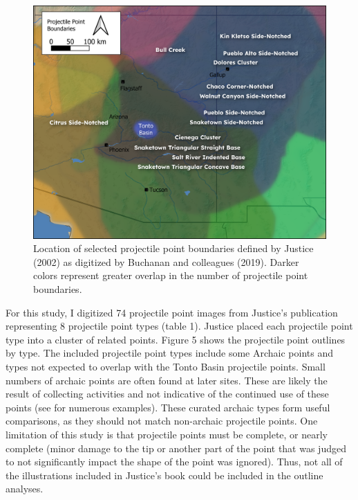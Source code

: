 \documentclass[a4paper]{article}
\begin{document}
\begin{figure}
\includegraphics[width=1\linewidth]{figures/ProjPointBoundaries} \caption{Location of selected projectile point boundaries defined by Justice (2002) as digitized by Buchanan and colleagues (2019). Darker colors represent greater overlap in the number of projectile point boundaries.}\label{fig:ProjectilePointBoundaries}
\end{figure}

For this study, I digitized 74 projectile point images from Justice's publication representing 8 projectile point types (table 1). Justice placed each projectile point type into a cluster of related points. Figure 5 shows the projectile point outlines by type. The included projectile point types include some Archaic points and types not expected to overlap with the Tonto Basin projectile points. Small numbers of archaic points are often found at later sites. These are likely the result of collecting activities and not indicative of the continued use of these points (see \textcite{Justice2002-cf} for numerous examples). These curated archaic types form useful comparisons, as they should not match non-archaic projectile points. One limitation of this study is that projectile points must be complete, or nearly complete (minor damage to the tip or another part of the point that was judged to not significantly impact the shape of the point was ignored). Thus, not all of the illustrations included in Justice's book could be included in the outline analyses.
\end{document}
